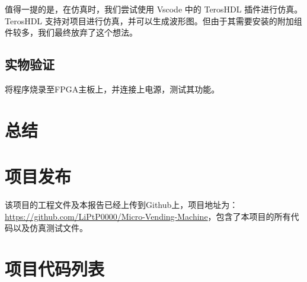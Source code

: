 \documentclass[12pt]{SEU-Circuit-Report}
\begin{document}
    值得一提的是，在仿真时，我们尝试使用 Vscode 中的 TerosHDL 插件进行仿真。TerosHDL 支持对项目进行仿真，并可以生成波形图。但由于其需要安装的附加组件较多，我们最终放弃了这个想法。
    \subsection{实物验证}
    将程序烧录至FPGA主板上，并连接上电源，测试其功能。
    \section{总结}

    \appendix
    \section{项目发布}
    该项目的工程文件及本报告已经上传到Github上，项目地址为：\url{https://github.com/LiPtP0000/Micro-Vending-Machine}，包含了本项目的所有代码以及仿真测试文件。
    \section{项目代码列表}
    
\end{document}
